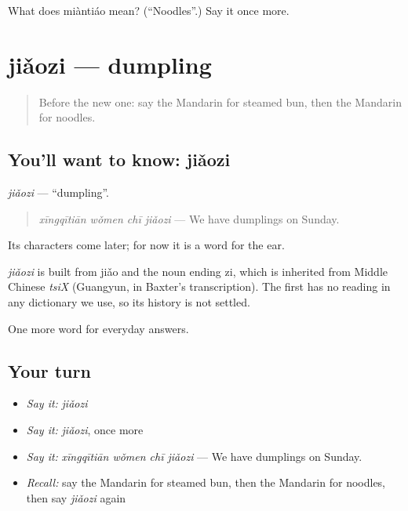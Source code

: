 \begin{tcolorbox}[breakable,colback=teal!4,colframe=teal!35!black,title={Before you move on}]
What does miàntiáo mean? (\textquotedblleft{}Noodles\textquotedblright{}.) Say it once more.
\end{tcolorbox}
\section[jiǎozi]{jiǎozi — dumpling}

\label{lesson:ZH-C70-jiaozi}



\begin{quote}
Before the new one: say the Mandarin for steamed bun, then the Mandarin for noodles.
\end{quote}

\subsection*{You'll want to know: jiǎozi}
\emph{jiǎozi} — \textquotedblleft{}dumpling\textquotedblright{}.

\begin{quote}
\emph{xīngqītiān wǒmen chī jiǎozi} — We have dumplings on Sunday.
\end{quote}

Its characters come later; for now it is a word for the ear.

\begin{cousinweb}
\emph{jiǎozi} is built from jiǎo and the noun ending zi, which is inherited from Middle Chinese \emph{tsiX} (Guangyun, in Baxter's transcription). The first has no reading in any dictionary we use, so its history is not settled.
\end{cousinweb}

\begin{grammarlens}[title={What you've built}]
One more word for everyday answers.
\end{grammarlens}

\subsection*{Your turn}
\begin{itemize}
\raggedright
  \item \emph{Say it:} \emph{jiǎozi}
  \item \emph{Say it:} \emph{jiǎozi}, once more
  \item \emph{Say it:} \emph{xīngqītiān wǒmen chī jiǎozi} — We have dumplings on Sunday.
  \item \emph{Recall:} say the Mandarin for steamed bun, then the Mandarin for noodles, then say \emph{jiǎozi} again
\end{itemize}

